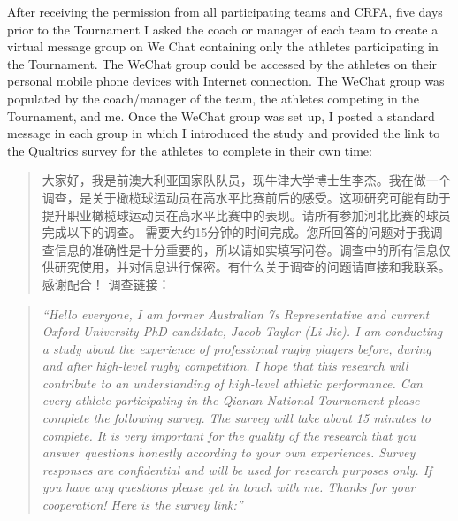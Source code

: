 After receiving the permission from all participating teams and CRFA, five days prior to the Tournament I asked the coach or manager of each team to create a virtual message group on We Chat containing only the athletes participating in the Tournament. The WeChat group could be accessed by the athletes on their personal mobile phone devices with Internet connection. The WeChat group was populated by the coach/manager of the team, the athletes competing in the Tournament, and me. Once the WeChat group was set up, I posted a standard message in each group in which I introduced the study and provided the link to the Qualtrics survey for the athletes to complete in their own time:\\

\begin{CJK}{UTF8}{gbsn}
  \begin{quotation}
    大家好，我是前澳大利亚国家队队员，现牛津大学博士生李杰。我在做一个调查，是关于橄榄球运动员在高水平比赛前后的感受。这项研究可能有助于提升职业橄榄球运动员在高水平比赛中的表现。请所有参加河北比赛的球员完成以下的调查。
    需要大约15分钟的时间完成。您所回答的问题对于我调查信息的准确性是十分重要的，所以请如实填写问卷。调查中的所有信息仅供研究使用，并对信息进行保密。有什么关于调查的问题请直接和我联系。感谢配合！ 调查链接：
  \end{quotation}
\end{CJK}

\begin{quotation}
      \textit{``Hello everyone, I am former Australian 7s Representative and current Oxford University PhD candidate, Jacob Taylor (Li Jie). I am conducting a study about the experience of professional rugby players before, during and after high-level rugby competition. I hope that this research will contribute to an understanding of high-level athletic performance. Can every athlete participating in the Qianan National Tournament please complete the following survey. The survey will take about 15 minutes to complete. It is very important for the quality of the research that you answer questions honestly according to your own experiences. Survey responses are confidential and will be used for research purposes only. If you have any questions please get in touch with me. Thanks for your cooperation! Here is the survey link:''}
\end{quotation}
\bigskip

